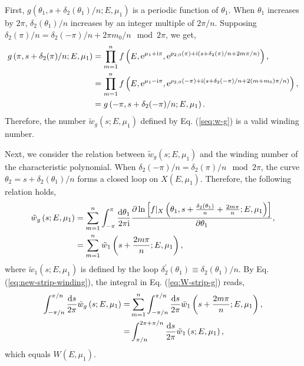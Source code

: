 \documentclass[pdflatex,sn-nature, iicol]{sn-jnl}%
\theoremstyle{thmstyleone}%
\theoremstyle{thmstyletwo}%
\theoremstyle{thmstylethree}%
\begin{document}
First, $g(\theta_{1},s+\delta_{2}(\theta_{1})/n;E,\mu_{1})$ is a
periodic function of $\theta_{1}$. When $\theta_{1}$ increases by
$2\pi$, $\delta_{2}(\theta_{1})/n$ increases by an integer multiple
of $2\pi/n$. Supposing $\delta_{2}(\pi)/n=\delta_{2}(-\pi)/n+2\pi m_{0}/n\mod{2\pi}$,
we get, 
\begin{align}
g\left(\pi,s+\delta_{2}(\pi)/n;E,\mu_{1}\right) & =\prod_{m=1}^{n}f\left(E,\mathrm{e}^{\mu_{1}+\mathrm{i}\pi},\mathrm{e}^{\rho_{2,0}(\pi)+\mathrm{i}\left(s+\delta_{2}(\pi)/n+2m\pi/n\right)}\right),\nonumber \\
 & =\prod_{m=1}^{n}f\left(E,\mathrm{e}^{\mu_{1}-\mathrm{i}\pi},\mathrm{e}^{\rho_{2,0}(-\pi)+\mathrm{i}\left(s+\delta_{2}(-\pi)/n+2(m+m_{0})\pi/n\right)}\right),\nonumber \\
 & =g\left(-\pi,s+\delta_{2}(-\pi)/n;E,\mu_{1}\right).
\end{align}
Therefore, the number $\tilde{w}_{g}(s;E,\mu_{1})$ defined by Eq.
(\ref{seq:w-g}) is a valid winding number.

Next, we consider the relation between $\tilde{w}_{g}(s;E,\mu_{1})$
and the winding number of the characteristic polynomial. When $\delta_{2}(-\pi)/n=\delta_{2}(\pi)/n\mod{2\pi}$,
the curve $\theta_{2}=s+\delta_{2}(\theta_{1})/n$ forms a closed
loop on $X(E,\mu_{1})$. Therefore, the following relation holds,
\begin{align}
\tilde{w}_{g}\left(s;E,\mu_{1}\right) & =\sum_{m=1}^{n}\int_{-\pi}^{\pi}\frac{\mathrm{d}\theta_{1}}{2\pi\mathrm{i}}\frac{\partial\ln\left[f|_{X}\left(\theta_{1},s+\frac{\delta_{2}(\theta_{1})}{n}+\frac{2m\pi}{n};E,\mu_{1}\right)\right]}{\partial\theta_{1}},\nonumber \\
 & =\sum_{m=1}^{n}\tilde{w}_{1}\left(s+\frac{2m\pi}{n};E,\mu_{1}\right),\label{seq:relation-winding-numbers}
\end{align}
where $\tilde{w}_{1}(s;E,\mu_{1})$ is defined by the loop $\delta_{2}^{\prime}(\theta_{1})\equiv\delta_{2}(\theta_{1})/n$.
By Eq. (\ref{eq:new-strip-winding}), the integral in Eq. (\ref{eq:W-strip-g})
reads, 
\begin{align}
\int_{-\pi/n}^{\pi/n}\frac{\mathrm{d} s}{2\pi}\tilde{w}_{g}\left(s;E,\mu_{1}\right)= & \sum_{m=1}^{n}\int_{-\pi/n}^{\pi/n}\frac{\mathrm{d} s}{2\pi}\tilde{w}_{1}\left(s+\frac{2m\pi}{n};E,\mu_{1}\right),\nonumber \\
= & \int_{\pi/n}^{2\pi+\pi/n}\frac{\mathrm{d} s}{2\pi}\tilde{w}_{1}\left(s;E,\mu_{1}\right),
\end{align}
which equals $W(E,\mu_{1})$.
\end{document}
